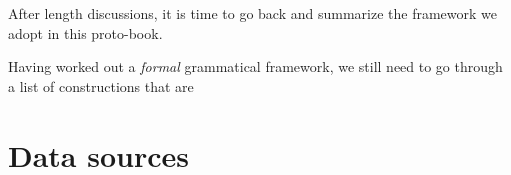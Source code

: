 \documentclass[../main.tex]{subfiles}
\begin{document}

After length discussions, it is time to go back and summarize the framework we adopt in this proto-book.

Having worked out a \emph{formal} grammatical framework, we still need to go through a list of constructions 
that are 


\section{Data sources}

\end{document}
